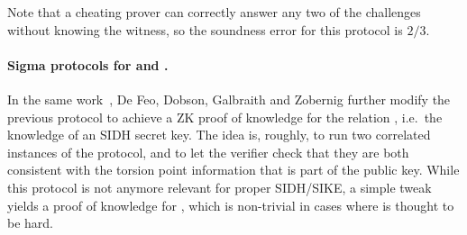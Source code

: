 Note that a cheating prover can correctly answer any two of the challenges without knowing the witness, so the soundness error for this protocol is $2/3$.



\paragraph{Sigma protocols for \R[SIDH] and \R[M-SIDH].}
In the same work~\cite{DFDGZ21}, De Feo, Dobson, Galbraith and Zobernig further modify the previous protocol to achieve a ZK proof of knowledge for the relation \R[SIDH], i.e.\ the knowledge of an SIDH secret key.
The idea is, roughly, to run two correlated instances of the protocol, and to let the verifier check that they are both consistent with the torsion point information that is part of the public key.
While this protocol is not anymore relevant for proper SIDH/SIKE, a simple tweak yields a proof of knowledge for \R[M-SIDH], which is non-trivial in cases where \R[M-SIDH] is thought to be hard.

